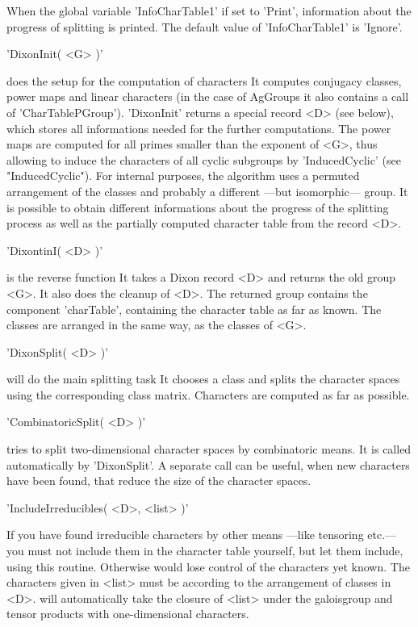 When the global variable 'InfoCharTable1' if set to 'Print',  information
about  the  progress  of  splitting  is  printed.  The  default  value of
'InfoCharTable1' is 'Ignore'.

'DixonInit( <G> )'%

does  the  setup  for  the  computation  of  characters{\:}  It  computes
conjugacy classes, power  maps  and  linear characters  (in  the  case of
AgGroups  it also  contains  a  call  of  'CharTablePGroup'). 'DixonInit'
returns a special record <D> (see below), which  stores all  informations
needed for the  further computations. The power maps are computed for all
primes  smaller than  the  exponent of  <G>, thus allowing  to induce the
characters   of   all   cyclic   subgroups   by   'InducedCyclic'    (see
"InducedCyclic").  For internal purposes, the  algorithm uses  a permuted
arrangement of the classes and probably a different ---but  isomorphic---
group.   It  is  possible  to  obtain  different  informations  about the
progress of the  splitting  process as  well  as the  partially  computed
character table from the record <D>.

'DixontinI( <D> )'%

is the reverse function{\:} It  takes a Dixon  record <D> and returns the
old group  <G>.  It also  does  the cleanup  of <D>.  The  returned group
contains the component 'charTable', containing the character table as far
as known. The  classes are arranged in the  same  way,  as the classes of
<G>.

'DixonSplit( <D> )'%

will  do  the  main splitting task{\:} It chooses a  class and splits the
character spaces using  the  corresponding class matrix.   Characters are
computed as far as possible.

'CombinatoricSplit( <D> )'%

tries to split two-dimensional character spaces by combinatoric means. It
is called automatically by 'DixonSplit'.  A separate call can be  useful,
when new  characters have  been  found,  that  reduce  the  size  of  the
character spaces.

'IncludeIrreducibles( <D>, <list> )'%

If you have found irreducible characters by other means ---like tensoring
etc.--- you  must not include them in the character  table  yourself, but
let them include, using this routine. Otherwise {\GAP} would lose control
of the  characters  yet known.  The  characters given in  <list> must  be
according to the arrangement of classes in <D>. {\GAP} will automatically
take the closure of <list> under the galoisgroup and tensor products with
one-dimensional characters.


